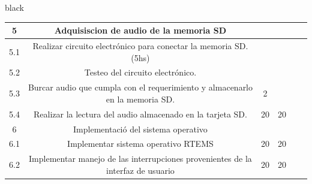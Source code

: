 \documentclass[11pt]{charter}
\begin{document}
\begin{consigna}{black}
\begin{table}[]
\begin{tabular}{|c|c|c|c|c|c|}
\rowcolor[HTML]{CBCEFB} 
5                                                                                              & Adquisiscion de audio de la memoria SD                                             &    &              &              &                                                                     \\ \hline
5.1                                                                                            & Realizar circuito electrónico para conectar la memoria SD. (5hs)                   &    &              &              &                                                                     \\ \hline
5.2                                                                                            & Testeo del circuito electrónico.                                                   &    &              &              &                                                                     \\ \hline
5.3                                                                                            & Burcar audio que cumpla con el requerimiento  y almacenarlo en la memoria SD.      & 2  &              &              &                                                                     \\ \hline
5.4                                                                                            & Realizar la lectura del audio almacenado en la tarjeta SD.                         & 20 & 20           &              &                                                                     \\ \hline
\rowcolor[HTML]{CBCEFB} 
6                                                                                              & Implementació del sistema operativo                                                &    &              &              &                                                                     \\ \hline
6.1                                                                                            & Implementar sistema operativo RTEMS                                                & 20 & 20           &              &                                                                     \\ \hline
6.2                                                                                            & Implementar manejo de las interrupciones  provenientes de la interfaz de usuario   & 20 & 20           &              &                                                                     \\ \hline

\end{tabular}
\end{table}
\end{consigna}
\end{document}
